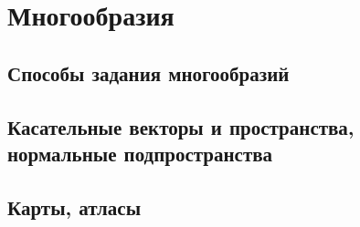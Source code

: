 \chapter{Многообразия}
	\section{Способы задания многообразий}
	\section{Касательные векторы и пространства, нормальные подпространства}
	\section{Карты, атласы}